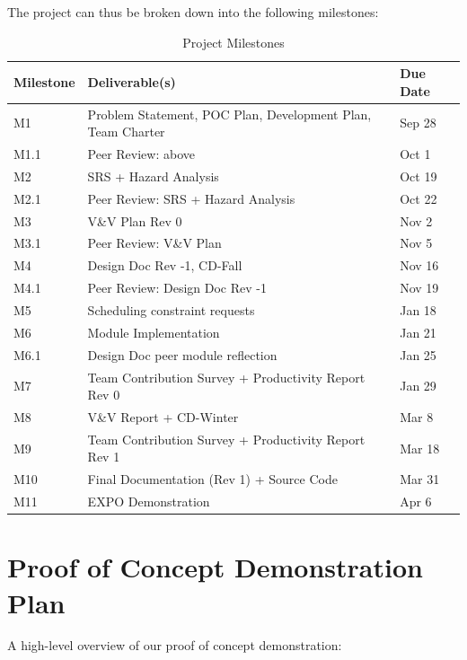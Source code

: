 \documentclass{article}
\begin{document}
The project can thus be broken down into the following milestones:

\begin{table}[H]
\centering
\caption{Project Milestones}
\label{tab:milestones}
\begin{tabularx}{\textwidth}{>{\raggedright\arraybackslash}p{1.8cm} >{\raggedright\arraybackslash}X >{\raggedright\arraybackslash}p{2.7cm}}
\toprule
\textbf{Milestone} & \textbf{Deliverable(s)} & \textbf{Due Date} \\
\midrule
M1 & Problem Statement, POC Plan, Development Plan, Team Charter & Sep 28 \\
M1.1 & Peer Review: above & Oct 1 \\
M2 & SRS + Hazard Analysis & Oct 19 \\
M2.1 & Peer Review: SRS + Hazard Analysis & Oct 22 \\
M3 & V\&V Plan Rev 0 & Nov 2 \\
M3.1 & Peer Review: V\&V Plan & Nov 5 \\
M4 & Design Doc Rev -1, CD-Fall & Nov 16 \\
M4.1 & Peer Review: Design Doc Rev -1 & Nov 19 \\
M5 & Scheduling constraint requests & Jan 18 \\
M6 & Module Implementation & Jan 21 \\
M6.1 & Design Doc peer module reflection & Jan 25 \\
M7 & Team Contribution Survey + Productivity Report Rev 0 & Jan 29 \\
M8 & V\&V Report + CD-Winter & Mar 8 \\
M9 & Team Contribution Survey + Productivity Report Rev 1 & Mar 18 \\
M10 & Final Documentation (Rev 1) + Source Code & Mar 31 \\
M11 & EXPO Demonstration & Apr 6 \\
\bottomrule
\end{tabularx}
\end{table}

\section{Proof of Concept Demonstration Plan}
A high-level overview of our proof of concept demonstration:
\end{document}
